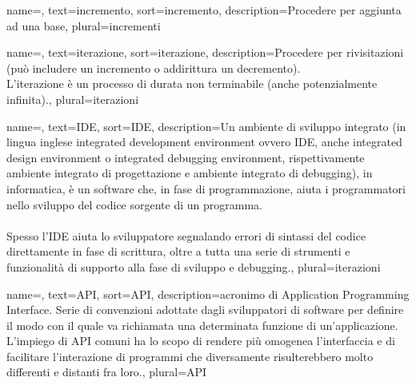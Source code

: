 
\renewcommand{\acronymname}{Acronimi e abbreviazioni}




{
    name=,
    text=incremento,
    sort=incremento,
    description={Procedere per aggiunta ad una base},
    plural=incrementi
}

{
    name=,
    text=iterazione,
    sort=iterazione,
    description={Procedere per rivisitazioni (può includere un incremento o addirittura un decremento).\\L'iterazione è un processo di durata non terminabile (anche potenzialmente infinita).},
    plural=iterazioni
}

{
	name=,
	text=IDE,
	sort=IDE,
	description={Un ambiente di sviluppo integrato (in lingua inglese integrated development environment ovvero IDE, anche integrated design environment o integrated debugging environment, rispettivamente ambiente integrato di progettazione e ambiente integrato di debugging), in informatica, è un software che, in fase di programmazione, aiuta i programmatori nello sviluppo del codice sorgente di un programma.\\ \\
	Spesso l'IDE aiuta lo sviluppatore segnalando errori di sintassi del codice direttamente in fase di scrittura, oltre a tutta una serie di strumenti e funzionalità di supporto alla fase di sviluppo e debugging.},
	plural=iterazioni
}


{
	name=,
	text=API,
	sort=API,
	description={acronimo di Application Programming Interface. Serie di convenzioni adottate dagli sviluppatori di software per definire il modo con il quale va richiamata una determinata funzione di un'applicazione. L'impiego di API comuni ha lo scopo di rendere più omogenea l'interfaccia e di facilitare l'interazione di programmi che diversamente risulterebbero molto differenti e distanti fra loro.},
	plural=API
}


